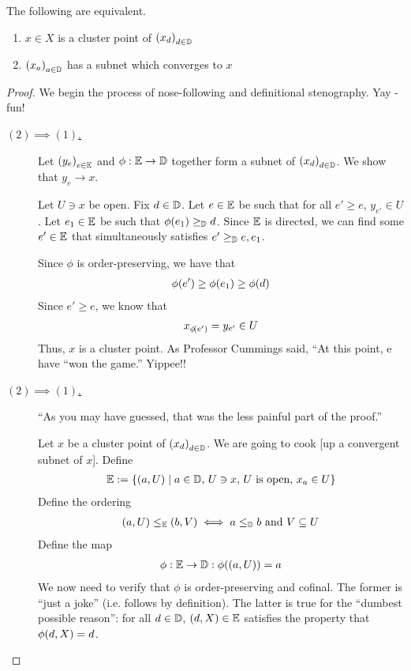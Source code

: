\begin{boxproposition}\label{Ch2:Prop:ClusterPt_iff}
    The following are equivalent.
    \begin{enumerate}[label = (\arabic*)]
        \item $x \in X$ is a cluster point of $\left( x_d \right)_{d \in \mathbb{D}}$
        \item $\left( x_a \right)_{a \in \mathbb{D}}$ has a subnet which converges to $x$
    \end{enumerate}
\end{boxproposition}
\begin{proof}
    We begin the process of nose-following and definitional stenography. Yay - fun!
    \begin{description}
        \item[\underline{$(2) \implies (1)$.}]
        Let $\left( y_e \right)_{e \in \mathbb{E}}$ and $\phi : \mathbb{E} \to \mathbb{D}$ together form a subnet of $\left( x_d \right)_{d \in \mathbb{D}}$. We show that $y_e \to x$.

        Let $U \ni x$ be open. Fix $d \in \mathbb{D}$. Let $e \in \mathbb{E}$ be such that for all $e' \geq e$, $y_{e'} \in U$. Let $e_1 \in \mathbb{E}$ be such that $\phi\!\left( e_1 \right) \geq_{\mathbb{D}} d$. Since $\mathbb{E}$ is directed, we can find some $e' \in \mathbb{E}$ that simultaneously satisfies $e' \geq_{\mathbb{D}} e, e_1$.

        Since $\phi$ is order-preserving, we have that
        \begin{align*}
            \phi\!\left( e' \right) \geq \phi\!\left( e_1 \right) \geq \phi(d)
        \end{align*}
        Since $e' \geq e$, we know that
        \begin{align*}
            x_{\phi\!\left( e' \right)} = y_{e'} \in U
        \end{align*}
        Thus, $x$ is a cluster point. As Professor Cummings said, ``At this point, e have ``won the game.'' Yippee!!

        \item[\underline{$(2) \implies (1)$.}]
        ``As you may have guessed, that was the less painful part of the proof.''
        
        Let $x$ be a cluster point of $\left( x_d \right)_{d \in \mathbb{D}}$. We are going to cook [up a convergent subnet of $x$]. Define
        \begin{align*}
            \mathbb{E} := \left\{ \left( a, U \right) \; \middle\vert \; a \in \mathbb{D}, \, U \ni x, \, U \text{ is open}, \, x_a \in U \right\}
        \end{align*}
        Define the ordering
        \begin{align*}
            \left( a, U \right) \leq_{\mathbb{E}} \left( b, V \right) \iff a \leq_{\mathbb{D}} b \text{ and } V \subseteq U
        \end{align*}
        Define the map
        \begin{align*}
            \phi : \mathbb{E} \to \mathbb{D} : \phi\!\left( \left( a, U \right) \right) = a
        \end{align*}
        We now need to verify that $\phi$ is order-preserving and cofinal. The former is ``just a joke'' (i.e. follows by definition). The latter is true for the ``dumbest possible reason'': for all $d \in \mathbb{D}$, $\left( d, X \right) \in \mathbb{E}$ satisfies the property that $\phi\!\left( d, X \right) = d$.
        

\end{description}
\end{proof}
